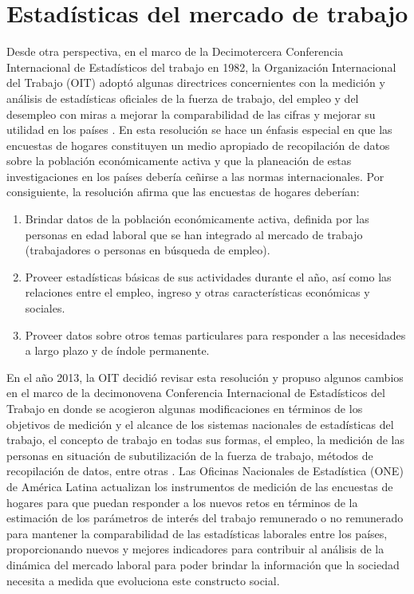 \documentclass[
  12pt,
  spanish,
]{book}
\providecommand{\tightlist}{%
  \setlength{\itemsep}{0pt}\setlength{\parskip}{0pt}}
\begin{document}
\hypertarget{estaduxedsticas-del-mercado-de-trabajo}{%
\section{Estadísticas del mercado de trabajo}\label{estaduxedsticas-del-mercado-de-trabajo}}

Desde otra perspectiva, en el marco de la Decimotercera Conferencia Internacional de Estadísticos del trabajo en 1982, la Organización Internacional del Trabajo (OIT) adoptó algunas directrices concernientes con la medición y análisis de estadísticas oficiales de la fuerza de trabajo, del empleo y del desempleo con miras a mejorar la comparabilidad de las cifras y mejorar su utilidad en los países \citep{OIT_1982}. En esta resolución se hace un énfasis especial en que las encuestas de hogares constituyen un medio apropiado de recopilación de datos sobre la población económicamente activa y que la planeación de estas investigaciones en los países debería ceñirse a las normas internacionales. Por consiguiente, la resolución afirma que las encuestas de hogares deberían:

\begin{enumerate}
\def\labelenumi{\arabic{enumi}.}
\tightlist
\item
  Brindar datos de la población económicamente activa, definida por las personas en edad laboral que se han integrado al mercado de trabajo (trabajadores o personas en búsqueda de empleo).
\item
  Proveer estadísticas básicas de sus actividades durante el año, así como las relaciones entre el empleo, ingreso y otras características económicas y sociales.
\item
  Proveer datos sobre otros temas particulares para responder a las necesidades a largo plazo y de índole permanente.
\end{enumerate}

En el año 2013, la OIT decidió revisar esta resolución y propuso algunos cambios en el marco de la decimonovena Conferencia Internacional de Estadísticos del Trabajo en donde se acogieron algunas modificaciones en términos de los objetivos de medición y el alcance de los sistemas nacionales de estadísticas del trabajo, el concepto de trabajo en todas sus formas, el empleo, la medición de las personas en situación de subutilización de la fuerza de trabajo, métodos de recopilación de datos, entre otras \citep{OIT_2013}. Las Oficinas Nacionales de Estadística (ONE) de América Latina actualizan los instrumentos de medición de las encuestas de hogares para que puedan responder a los nuevos retos en términos de la estimación de los parámetros de interés del trabajo remunerado o no remunerado para mantener la comparabilidad de las estadísticas laborales entre los países, proporcionando nuevos y mejores indicadores para contribuir al análisis de la dinámica del mercado laboral para poder brindar la información que la sociedad necesita a medida que evoluciona este constructo social.
\end{document}
